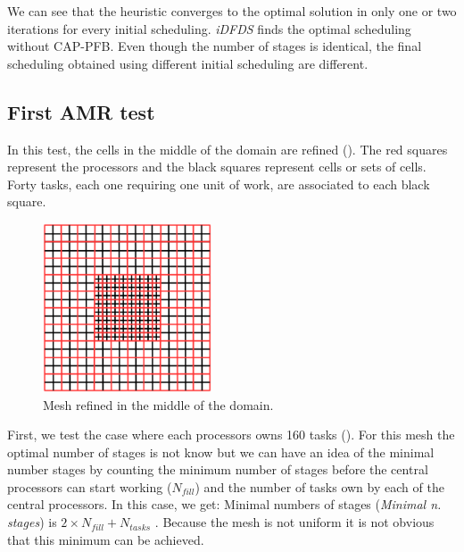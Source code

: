 \documentclass[letterpaper]{article}
\renewcommand{\(}{\left(}
\renewcommand{\)}{\right)}
\renewcommand{\[}{\left[}
\renewcommand{\]}{\right]}
\begin{document}
We can see that the heuristic converges to the optimal solution in only one or
two iterations for every initial scheduling. \emph{iDFDS} finds the optimal
scheduling without CAP-PFB. Even though the number of stages is
identical, the final scheduling obtained using different initial scheduling are
different. 

\subsection{First AMR test}
In this test, the cells in the middle of the domain are refined ().
The red squares represent the processors and the black squares represent cells
or sets of cells. Forty tasks, each one requiring one unit of work, are
associated to each black square.
\begin{figure}[H]
  \centering
  \includegraphics[width=5cm]{mesh}
  \caption{Mesh refined in the middle of the domain.}
  \label{mesh_1}
\end{figure}
First, we test the case where each processors owns 160 tasks (). For
this mesh the optimal number of stages is not know but we can have an idea of
the minimal number stages by counting the minimum number of stages before the
central processors can start working ($N_{fill}$)
and the number of tasks own by each of the central processors. In
this case, we get: Minimal numbers of stages (\emph{Minimal n. stages}) is $2\times N_{fill}+N_{tasks}$
\cite{Adams2013}. Because the mesh is not uniform it is not obvious that this
minimum can be achieved. 
\end{document}
